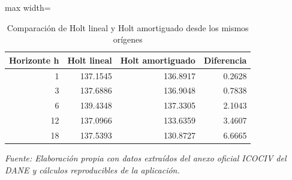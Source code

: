 \begin{table}[H]
\centering
\caption{Comparación de Holt lineal y Holt amortiguado desde los mismos orígenes}
\label{tab:ejemplo_holt_comparacion_vias_urbanas}
\scriptsize
\begin{adjustbox}{max width=\linewidth}
\begin{tabular}{rrrr}
\toprule
Horizonte h & Holt lineal & Holt amortiguado & Diferencia \\
\midrule
1 & 137.1545 & 136.8917 & 0.2628 \\
3 & 137.6886 & 136.9048 & 0.7838 \\
6 & 139.4348 & 137.3305 & 2.1043 \\
12 & 137.0966 & 133.6359 & 3.4607 \\
18 & 137.5393 & 130.8727 & 6.6665 \\
\bottomrule
\end{tabular}
\end{adjustbox}
\par\footnotesize\textit{Fuente: Elaboración propia con datos extraídos del anexo oficial ICOCIV del DANE y cálculos reproducibles de la aplicación.}
\end{table}
